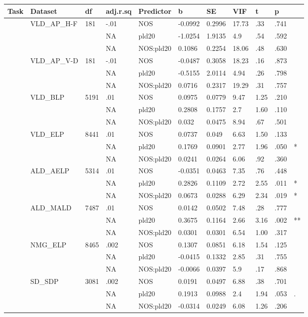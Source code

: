 \begin{table}[ht]
\centering
\begingroup\normalsize
\begin{tabular}{lllllllllll}
  \hline
Task & Dataset & df & adj.r.sq & Predictor & b & SE & VIF & t & p &  \\ 
  \hline
 & VLD\_AP\_H-F & 181 & -.01 & NOS & -0.0992 & 0.2996 & 17.73 & .33 & .741 &   \\ 
   &  &  & NA & pld20 & -1.0254 & 1.9135 & 4.9 & .54 & .592 &   \\ 
   &  &  & NA & NOS:pld20 & 0.1086 & 0.2254 & 18.06 & .48 & .630 &   \\ 
   & VLD\_AP\_V-D & 181 & -.01 & NOS & -0.0487 & 0.3058 & 18.23 & .16 & .873 &   \\ 
   &  &  & NA & pld20 & -0.5155 & 2.0114 & 4.94 & .26 & .798 &   \\ 
   &  &  & NA & NOS:pld20 & 0.0716 & 0.2317 & 19.29 & .31 & .757 &   \\ 
   & VLD\_BLP & 5191 & .01 & NOS & 0.0975 & 0.0779 & 9.47 & 1.25 & .210 &   \\ 
   &  &  & NA & pld20 & 0.2808 & 0.1757 & 2.7 & 1.60 & .110 &   \\ 
   &  &  & NA & NOS:pld20 & 0.032 & 0.0475 & 8.94 & .67 & .501 &   \\ 
   & VLD\_ELP & 8441 & .01 & NOS & 0.0737 & 0.049 & 6.63 & 1.50 & .133 &   \\ 
   &  &  & NA & pld20 & 0.1769 & 0.0901 & 2.77 & 1.96 & .050 & * \\ 
   &  &  & NA & NOS:pld20 & 0.0241 & 0.0264 & 6.06 & .92 & .360 &   \\ 
   & ALD\_AELP & 5314 & .01 & NOS & -0.0351 & 0.0463 & 7.35 & .76 & .448 &   \\ 
   &  &  & NA & pld20 & 0.2826 & 0.1109 & 2.72 & 2.55 & .011 & * \\ 
   &  &  & NA & NOS:pld20 & 0.0673 & 0.0288 & 6.29 & 2.34 & .019 & * \\ 
   & ALD\_MALD & 7487 & .01 & NOS & 0.0142 & 0.0502 & 7.48 & .28 & .777 &   \\ 
   &  &  & NA & pld20 & 0.3675 & 0.1164 & 2.66 & 3.16 & .002 & ** \\ 
   &  &  & NA & NOS:pld20 & 0.0301 & 0.0301 & 6.54 & 1.00 & .317 &   \\ 
   & NMG\_ELP & 8465 & .002 & NOS & 0.1307 & 0.0851 & 6.18 & 1.54 & .125 &   \\ 
   &  &  & NA & pld20 & -0.0415 & 0.1332 & 2.85 & .31 & .755 &   \\ 
   &  &  & NA & NOS:pld20 & -0.0066 & 0.0397 & 5.9 & .17 & .868 &   \\ 
   & SD\_SDP & 3081 & .002 & NOS & 0.0191 & 0.0497 & 6.88 & .38 & .701 &   \\ 
   &  &  & NA & pld20 & 0.1913 & 0.0988 & 2.4 & 1.94 & .053 & . \\ 
   &  &  & NA & NOS:pld20 & -0.0314 & 0.0249 & 6.08 & 1.26 & .206 &   \\ 
   \hline
\end{tabular}
\endgroup
\end{table}
